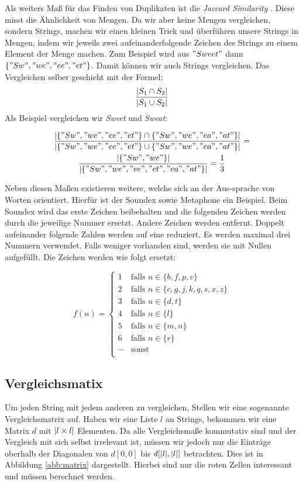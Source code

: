 \documentclass[sigconf]{acmart}
\DeclarePairedDelimiter\abs{\lvert}{\rvert}
\begin{document}
Als weiters Maß für das Finden von Duplikaten ist die
\emph{Jaccard Similarity} \cite[Vgl. 4.1.1]{theobald2008spotsigs}. 
Diese misst die Ähnlichkeit von Mengen. Da wir aber keine Mengen 
vergleichen, sondern Strings, machen wir einen
kleinen Trick und überführen unsere Strings in Mengen, indem wir
jeweils zwei aufeinanderfolgende Zeichen des Strings zu einem Element
der Menge machen. Zum Beispiel wird aus $"Sweet"$ dann
$\{"Sw", "we", "ee", "et" \}$. Damit können wir auch Strings vergleichen.
Das Vergleichen selber geschieht mit der Formel:
$$\frac{\abs{S_1 \cap S_2}}{\abs{S_1 \cup S_2}}$$
Als Beispiel vergleichen wir \emph{Sweet} und \emph{Sweat}:

\begin{gather*}
  \frac{
    \abs{\{"Sw", "we", "ee", "et" \} \cap \{"Sw", "we", "ea", "at" \}}
  }{
    \abs{\{"Sw", "we", "ee", "et" \} \cup \{"Sw", "we", "ea", "at" \}}
  }
  = \\
  \frac{
    \abs{\{"Sw", "we"\}}
  }{
    \abs{\{"Sw", "we", "ee", "et", "ea", "at" \}}
  }
  = 
  \frac{1}{3}
\end{gather*}

Neben diesen Maßen existieren weitere, welche sich an der
Aus-sprache von Worten orientiert. Hierfür ist der Soundex 
\cite[Vlg. S. 5]{elmagarmid1} sowie Metaphone 
\cite[Vlg. S. 5]{elmagarmid1} ein Beispiel.
Beim Soundex wird das erste Zeichen beibehalten und die folgenden
Zeichen werden durch die jeweilige Nummer ersetzt. 
Andere Zeichen werden entfernt. Doppelt aufeinander 
folgende Zahlen werden auf eine reduziert.
Es werden maximal drei Nummern verwendet. Falls weniger vorhanden sind,
werden sie mit Nullen aufgefüllt. Die Zeichen werden
wie folgt ersetzt:


\[ f(n) =
  \begin{cases}
    1      & \text{falls } n \in \{b,f,p,v\}\\
    2      & \text{falls } n \in \{c,g,j,k,q,s,x,z\}\\
    3      & \text{falls } n \in \{d,t\}\\
    4      & \text{falls } n \in \{l\}\\
    5      & \text{falls } n \in \{m,n\}\\
    6      & \text{falls } n \in \{r\}\\
    -     & \text{sonst }\\
  \end{cases}
\]




\subsection*{Vergleichsmatix}
Um jeden String mit jedem anderen zu vergleichen, Stellen wir eine
sogenannte Vergleichsmatrix auf. Haben wir eine Liste $l$ an Strings,
bekommen wir eine Matrix $d$ mit $\abs{l\times l}$ Elementen. Da alle
Vergleichsmaße kommutativ sind und der Vergleich mit sich selbst
irrelevant ist, müssen wir jedoch nur die Einträge oberhalb der
Diagonalen von $d[0,0]$ bis $d[\abs{l}, \abs{l}]$ betrachten.
Dies ist in Abbildung \ref{abb:matrix} dargestellt. Hierbei
sind nur die roten Zellen interessant und müssen berechnet werden.
\end{document}
